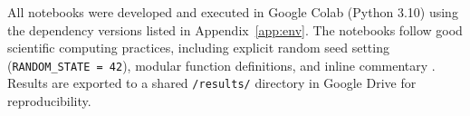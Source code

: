 All notebooks were developed and executed in Google Colab (Python 3.10) using the dependency versions listed in Appendix~\ref{app:env}. The notebooks follow good scientific computing practices, including explicit random seed setting (\texttt{RANDOM\_STATE = 42}), modular function definitions, and inline commentary \citep{wilson2017good}. Results are exported to a shared \texttt{/results/} directory in Google Drive for reproducibility.
